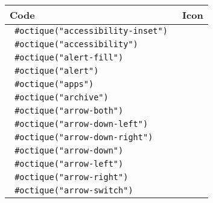 \begin{longtable}[]{@{}lc@{}}
\toprule\noalign{}
Code & Icon \\
\midrule\noalign{}
\endhead
\bottomrule\noalign{}
\endlastfoot
\texttt{\ \#octique("accessibility-inset")\ } &
\pandocbounded{} \\
\texttt{\ \#octique("accessibility")\ } &
\pandocbounded{} \\
\texttt{\ \#octique("alert-fill")\ } &
\pandocbounded{} \\
\texttt{\ \#octique("alert")\ } &
\pandocbounded{} \\
\texttt{\ \#octique("apps")\ } &
\pandocbounded{} \\
\texttt{\ \#octique("archive")\ } &
\pandocbounded{} \\
\texttt{\ \#octique("arrow-both")\ } &
\pandocbounded{} \\
\texttt{\ \#octique("arrow-down-left")\ } &
\pandocbounded{} \\
\texttt{\ \#octique("arrow-down-right")\ } &
\pandocbounded{} \\
\texttt{\ \#octique("arrow-down")\ } &
\pandocbounded{} \\
\texttt{\ \#octique("arrow-left")\ } &
\pandocbounded{} \\
\texttt{\ \#octique("arrow-right")\ } &
\pandocbounded{} \\
\texttt{\ \#octique("arrow-switch")\ } &
\pandocbounded{} \\

\end{longtable}
